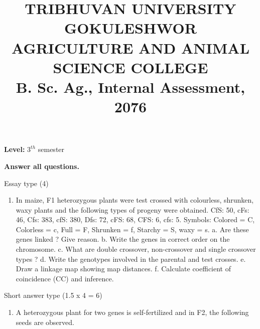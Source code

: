 \documentclass[10pt,]{article}
\title{\vspace{0.25cm} \Large{\textbf{TRIBHUVAN UNIVERSITY}}\\
\vspace{0.20cm} \large{GOKULESHWOR AGRICULTURE AND ANIMAL SCIENCE COLLEGE}\\
\vspace{0.20cm} \large{B. Sc. Ag., Internal Assessment, 2076}}
\author{}
\date{}
\providecommand{\tightlist}{%
  \setlength{\itemsep}{0pt}\setlength{\parskip}{0pt}}
\begin{document}
\maketitle

\begingroup

\hspace{0.5\textwidth}

\par
\endgroup

\begingroup

\hspace{0.5\textwidth}

\par
\endgroup

\textbf{Level:} \(3^{th}\) semester

\textbf{Answer all questions.}

Essay type (4)

\begin{enumerate}
\def\labelenumi{\arabic{enumi}.}
\tightlist
\item
  In maize, F1 heterozygous plants were test crossed with colourless, shrunken, waxy plants and the following types of progeny were obtained. CfS: 50, cFs: 46, Cfs: 383, cfS: 380, Dfs: 72, cFS: 68, CFS: 6, cfs: 5. Symbols: Colored = C, Colorless = c, Full = F, Shrunken = f, Starchy = S, waxy = s. \newline a. Are these genes linked ? Give reason. \newline b. Write the genes in correct order on the chromosome. \newline c. What are double crossover, non-crossover and single crossover types ? \newline d. Write the genotypes involved in the parental and test crosses. \newline e. Draw a linkage map showing map distances. \newline f. Calculate coefficient of coincidence (CC) and inference.
\end{enumerate}

Short answer type (1.5 x 4 = 6)

\begin{enumerate}
\def\labelenumi{\arabic{enumi}.}
\tightlist
\item
  A heterozygous plant for two genes is self-fertilized and in F2, the following seeds are observed.
\end{enumerate}
\end{document}
